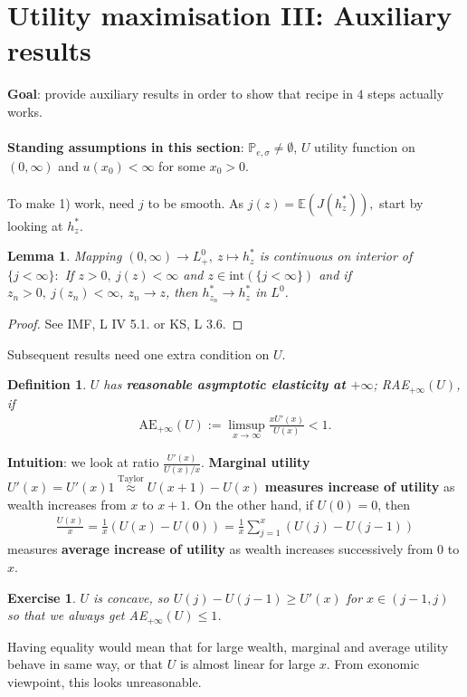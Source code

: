 \documentclass[12pt,a4paper, twoside]{article}
\newtheorem{lem}{Lemma}[section]
\newtheorem{defn}{Definition}[section]
\newtheorem{exe}{Exercise}[section]
\theoremstyle{definition}
\newcommand{\EE}{\mathbb{E}} %
\newcommand{\PP}{\mathbb{P}} %
\begin{document}
\section{Utility maximisation III: Auxiliary results}
\textbf{Goal}: provide auxiliary results in order to show that recipe in $4$ steps actually works. 
\\\\
\textbf{Standing assumptions in this section}: $\PP_{e, \sigma} \neq \emptyset$, $U$ utility function on $(0, \infty)$ and $u(x_0) < \infty$ for some $x_0 >0$.\\
\\
To make 1) work, need $j$ to be smooth. As $j(z)= \EE(J(h_z^*)),$ start by looking at $h_z^*$. 
\begin{lem} \label{L121} Mapping $(0, \infty) \to L_+^0, \ z \mapsto h_z^*$ is continuous on interior of \\ $\{j < \infty\}:$ If $z >0, \ j(z) < \infty$ and $z \in \text{int}(\{j < \infty\})$ and if $z_n >0, \ j(z_n) < \infty, \ z_n \to z$, then $h_{z_n}^* \to h_z^*$ in $L^0$. 
\end{lem}
\begin{proof}
See IMF, L IV 5.1. or KS, L 3.6.
\end{proof}
Subsequent results need one extra condition on $U$. 
\begin{defn} $U$ has \textbf{reasonable asymptotic elasticity at $+ \infty$}; RAE$_{+ \infty}(U)$, if 
\begin{align*}
\text{AE}_{+ \infty}(U):= \limsup_{x \to \infty} \frac{x U'(x)}{U(x)}<1.
\end{align*}
\end{defn}
\noindent \textbf{Intuition}: we look at ratio  $\frac{U'(x)}{U(x)/x}$. \textbf{Marginal utility} $U'(x)=U'(x)1 \overset{\text{Taylor}}\approx U(x+1)-U(x)$ \textbf{measures increase of utility} as wealth increases from $x$ to $x+1$. On the other hand, if $U(0)=0$, then 
\begin{align*}
\frac{U(x)}{x} = \frac{1}{x}(U(x)-U(0)) = \frac{1}{x} \sum_{j=1}^x (U(j)-U(j-1))
\end{align*}
measures \textbf{average increase of utility} as wealth increases successively from $0$ to $x$. \begin{exe} $U$ is concave, so $U(j)-U(j-1) \geq U'(x)$ for $x \in (j-1,j)$ so that we always get AE$_{+ \infty}(U) \leq 1$.
\end{exe}
Having equality would mean that for large wealth, marginal and average utility behave in same way, or that $U$ is almost linear for large $x$. From exonomic viewpoint, this looks unreasonable. 
\end{document}
